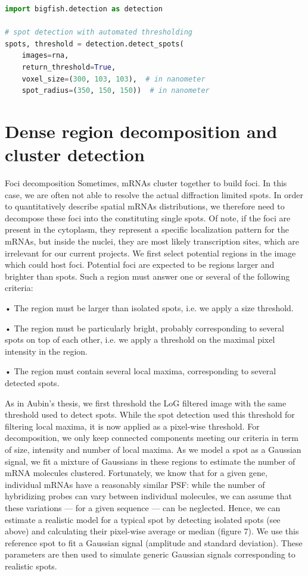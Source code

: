 
\begin{minipage}{\linewidth}
\begin{lstlisting}[language=Python]
import bigfish.detection as detection

# spot detection with automated thresholding
spots, threshold = detection.detect_spots(
    images=rna,
    return_threshold=True,
    voxel_size=(300, 103, 103),  # in nanometer
    spot_radius=(350, 150, 150))  # in nanometer
\end{lstlisting}
\end{minipage}

\section{Dense region decomposition and cluster detection}

Foci decomposition Sometimes, mRNAs cluster together to build foci. In this
case, we are often not able to resolve the actual diffraction limited spots.
In order to quantitatively describe spatial mRNAs distributions, we therefore
need to decompose these foci into the constituting single spots. Of note, if
the foci are present in the cytoplasm, they represent a specific localization
pattern for the mRNAs, but inside the nuclei, they are most likely transcription
sites, which are irrelevant for our current projects.
We first select potential regions in the image which could host foci. Potential
foci are expected to be regions larger and brighter than spots. Such a region must
answer one or several of the following criteria:

• The region must be larger than isolated spots, i.e. we apply a size threshold.

• The region must be particularly bright, probably corresponding to several spots
on top of each other, i.e. we apply a threshold on the maximal pixel intensity in
the region.

• The region must contain several local maxima, corresponding to several detected
spots.

As in Aubin’s thesis, we first threshold the LoG filtered image with the same
threshold used to detect spots. While the spot detection used this threshold for
filtering local maxima, it is now applied as a pixel-wise threshold. For
decomposition, we only keep connected components meeting our criteria in term
of size, intensity and number of local maxima.
As we model a spot as a Gaussian signal, we fit a mixture of Gaussians in these
regions to estimate the number of mRNA molecules clustered. Fortunately, we
know that for a given gene, individual mRNAs have a reasonably similar PSF: while
the number of hybridizing probes can vary between individual molecules, we can
assume that these variations — for a given sequence — can be neglected. Hence,
we can estimate a realistic model for a typical spot by detecting isolated spots
(see above) and calculating their pixel-wise average or median (figure 7). We use
this reference spot to fit a Gaussian signal (amplitude and standard deviation).
These parameters are then used to simulate generic Gaussian signals corresponding
to realistic spots.


